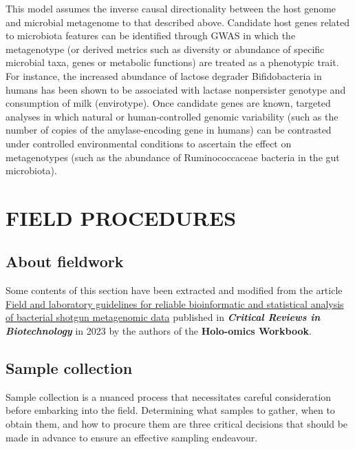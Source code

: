 \documentclass[
]{book}
\begin{document}
This model assumes the inverse causal directionality between the host genome and microbial metagenome to that described above. Candidate host genes related to microbiota features can be identified through GWAS in which the metagenotype (or derived metrics such as diversity or abundance of specific microbial taxa, genes or metabolic functions) are treated as a phenotypic trait. For instance, the increased abundance of lactose degrader Bifidobacteria in humans has been shown to be associated with lactase nonpersister genotype and consumption of milk (envirotype). Once candidate genes are known, targeted analyses in which natural or human-controlled genomic variability (such as the number of copies of the amylase-encoding gene in humans) can be contrasted under controlled environmental conditions to ascertain the effect on metagenotypes (such as the abundance of Ruminococcaceae bacteria in the gut microbiota).

\hypertarget{part-field-procedures}{%
\part{FIELD PROCEDURES}\label{part-field-procedures}}

\hypertarget{about-fieldwork}{%
\chapter{About fieldwork}\label{about-fieldwork}}

Some contents of this section have been extracted and modified from the article \href{https://www.nature.com/articles/s41576-021-00421-0}{Field and laboratory guidelines for reliable bioinformatic and statistical analysis of bacterial shotgun metagenomic data} published in \textbf{\emph{Critical Reviews in Biotechnology}} in 2023 by the authors of the \textbf{Holo-omics Workbook}.

\hypertarget{fieldwork-sample-collection}{%
\chapter{Sample collection}\label{fieldwork-sample-collection}}

Sample collection is a nuanced process that necessitates careful consideration before embarking into the field. Determining what samples to gather, when to obtain them, and how to procure them are three critical decisions that should be made in advance to ensure an effective sampling endeavour.
\end{document}

